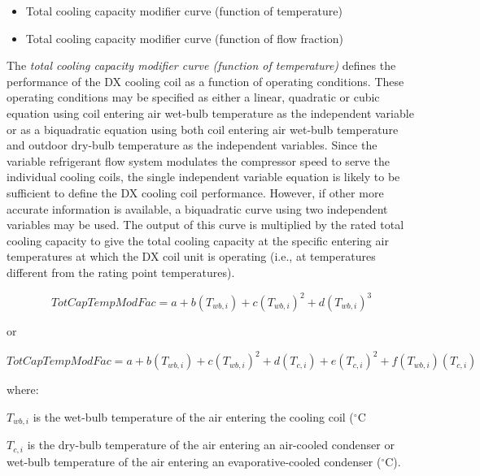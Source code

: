 \begin{itemize}
\item Total cooling capacity modifier curve (function of temperature)
\item Total cooling capacity modifier curve (function of flow fraction)

\end{itemize}

The \emph{total cooling capacity modifier curve (function of temperature)} defines the performance of the DX cooling coil as a function of operating conditions. These operating conditions may be specified as either a linear, quadratic or cubic equation using coil entering air wet-bulb temperature as the independent variable or as a biquadratic equation using both coil entering air wet-bulb temperature and outdoor dry-bulb temperature as the independent variables. Since the variable refrigerant flow system modulates the compressor speed to serve the individual cooling coils, the single independent variable equation is likely to be sufficient to define the DX cooling coil performance. However, if other more accurate information is available, a biquadratic curve using two independent variables may be used. The output of this curve is multiplied by the rated total cooling capacity to give the total cooling capacity at the specific entering air temperatures at which the DX coil unit is operating (i.e., at temperatures different from the rating point temperatures).

\begin{equation}
TotCapTempModFac = a + b\left( {{T_{wb,i}}} \right) + c{\left( {{T_{wb,i}}} \right)^2} + d{\left( {{T_{wb,i}}} \right)^3}
\end{equation}

or

\begin{equation}
TotCapTempModFac = a + b\left( {{T_{wb,i}}} \right) + c{\left( {{T_{wb,i}}} \right)^2} + d\left( {{T_{c,i}}} \right) + e{\left( {{T_{c,i}}} \right)^2} + f\left( {{T_{wb,i}}} \right)\left( {{T_{c,i}}} \right)
\end{equation}

where:

\({{T_{wb,i}}}\) is the wet-bulb temperature of the air entering the cooling coil (\(^{\circ}\)C

\({{T_{c,i}}}\) is the dry-bulb temperature of the air entering an air-cooled condenser or wet-bulb temperature of the air entering an evaporative-cooled condenser (\(^{\circ}\)C).


